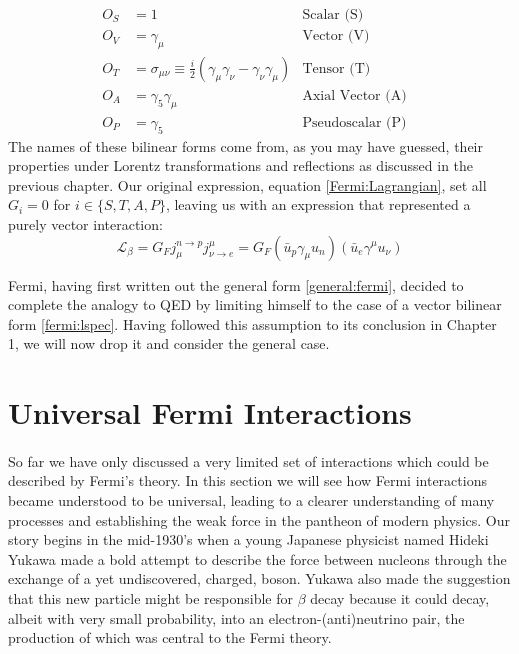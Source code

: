 \documentclass[12pt]{book}
\begin{document}
\begin{align}\label{bilin}
O_{S} & = 1 & 
	\text{Scalar (S)} & \\
O_{V} & = \gamma_{\mu} & 
	\text{Vector (V)} & \\
O_{T} & = \sigma_{\mu \nu} \equiv \frac{i}{2}\left(\gamma_{\mu}\gamma_{\nu}-\gamma_{\nu}\gamma_{\mu}\right) &
	 \text{Tensor (T)} & \\
O_{A} & = \gamma_{5}\gamma_{\mu} & 
	\text{Axial Vector (A)} & \\
O_{P} & = \gamma_{5} & 
	\text{Pseudoscalar (P)} &
\end{align}
The names of these bilinear forms come from, as you may have guessed, their properties under Lorentz transformations and reflections as discussed in the previous chapter. Our original expression, equation \ref{Fermi:Lagrangian}, set all $G_{i}=0$ for $i\in \{S, T, A, P\}$, leaving us with an expression that represented a purely vector interaction:
\begin{equation}\label{fermi:lspec}
 \mathcal{L}_{\beta}=G_{F}j_{\mu}^{n\rightarrow p}j_{\nu \rightarrow e}^{\mu}=G_{F}\left(\bar{u}_{p}\gamma_{\mu} u_{n}\right)\left(\bar{u}_{e}\gamma^{\mu} u_{\nu}\right)
\end{equation}

Fermi, having first written out the general form \ref{general:fermi}, decided to complete the analogy to QED by limiting himself to the case of a vector bilinear form \ref{fermi:lspec}. Having followed this assumption to its conclusion in Chapter 1, we will now drop it and consider the general case.

\section{Universal Fermi Interactions}

\paragraph{}So far we have only discussed a very limited set of interactions which could be described by Fermi's theory. In this section we will see how Fermi interactions became understood to be universal, leading to a clearer understanding of many processes and establishing the weak force in the pantheon of modern physics. Our story begins in the mid-1930's when a young Japanese physicist named Hideki Yukawa made a bold attempt to describe the force between nucleons through the exchange of a yet undiscovered, charged, boson\cite{yukawa}. Yukawa also made the suggestion that this new particle might be responsible for $\beta$ decay because it could decay, albeit with very small probability, into an electron-(anti)neutrino pair, the production of which was central to the Fermi theory.
\end{document}
